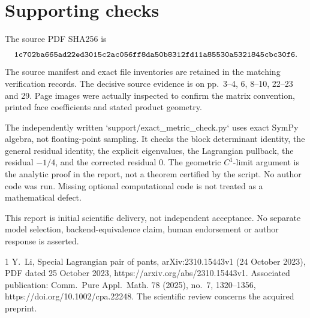 \documentclass[10pt]{article}
\begin{document}
\section*{Supporting checks}
The source PDF SHA256 is \[\text{\texttt{1c702ba665ad22ed3015c2ac056ff8da50b8312fd11a85530a5321845cbc30f6}}.\] The source manifest and exact file inventories are retained in the matching verification records. The decisive source evidence is on pp. 3–4, 6, 8–10, 22–23 and 29. Page images were actually inspected to confirm the matrix convention, printed face coefficients and stated product geometry.\par
The independently written `support/exact\_metric\_check.py` uses exact SymPy algebra, not floating-point sampling. It checks the block determinant identity, the general residual identity, the explicit eigenvalues, the Lagrangian pullback, the residual \(-1/4\), and the corrected residual \(0\). The geometric \(C^1\)-limit argument is the analytic proof in the report, not a theorem certified by the script. No author code was run. Missing optional computational code is not treated as a mathematical defect.\par
This report is initial scientific delivery, not independent acceptance. No separate model selection, backend-equivalence claim, human endorsement or author response is asserted.\par
1 Y. Li, Special Lagrangian pair of pants, arXiv:2310.15443v1 (24 October 2023), PDF dated 25 October 2023, https://arxiv.org/abs/2310.15443v1. Associated publication: Comm. Pure Appl. Math. 78 (2025), no. 7, 1320–1356, https://doi.org/10.1002/cpa.22248. The scientific review concerns the acquired preprint.\par
\end{document}
